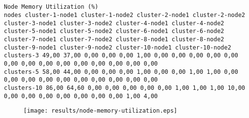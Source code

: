 \documentclass{elsart}
\begin{document}
\subsection{}

\begin{lstlisting}[caption={}]
Node Memory Utilization (%)
nodes cluster-1-node1 cluster-1-node2 cluster-2-node1 cluster-2-node2 cluster-3-node1 cluster-3-node2 cluster-4-node1 cluster-4-node2 cluster-5-node1 cluster-5-node2 cluster-6-node1 cluster-6-node2 cluster-7-node1 cluster-7-node2 cluster-8-node1 cluster-8-node2 cluster-9-node1 cluster-9-node2 cluster-10-node1 cluster-10-node2
clusters-3 49,00 37,00 0,00 0,00 0,00 1,00 0,00 0,00 0,00 0,00 0,00 0,00 0,00 0,00 0,00 0,00 0,00 0,00 0,00 0,00
clusters-5 58,00 44,00 0,00 0,00 0,00 1,00 0,00 0,00 1,00 1,00 0,00 0,00 0,00 0,00 0,00 0,00 0,00 0,00 0,00 0,00
clusters-10 86,00 64,60 0,00 0,00 0,00 0,00 0,00 1,00 1,00 1,00 10,00 0,00 0,00 0,00 0,00 0,00 0,00 0,00 1,00 4,00
\end{lstlisting}

\begin{figure}[ht]
\centering
\texttt{[image: results/node-memory-utilization.eps]}
\caption{}\label{fig:node-memory-utilization.eps}
\end{figure}
\end{document}
